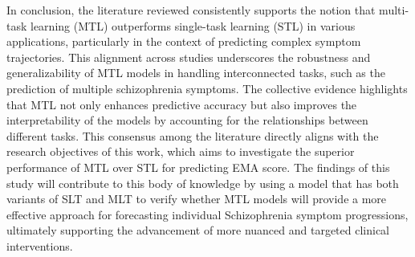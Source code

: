 In conclusion, the literature reviewed consistently supports the notion that multi-task learning (MTL) outperforms single-task learning (STL) in various applications, particularly in the context of predicting complex symptom trajectories. This alignment across studies underscores the robustness and generalizability of MTL models in handling interconnected tasks, such as the prediction of multiple schizophrenia symptoms. The collective evidence highlights that MTL not only enhances predictive accuracy but also improves the interpretability of the models by accounting for the relationships between different tasks. This consensus among the literature directly aligns with the research objectives of this work, which aims to investigate the superior performance of MTL over STL for predicting EMA score. The findings of this study will contribute to this body of knowledge by using a model that has both variants of SLT and MLT to verify whether MTL models will provide a more effective approach for forecasting individual Schizophrenia symptom progressions, ultimately supporting the advancement of more nuanced and targeted clinical interventions.

